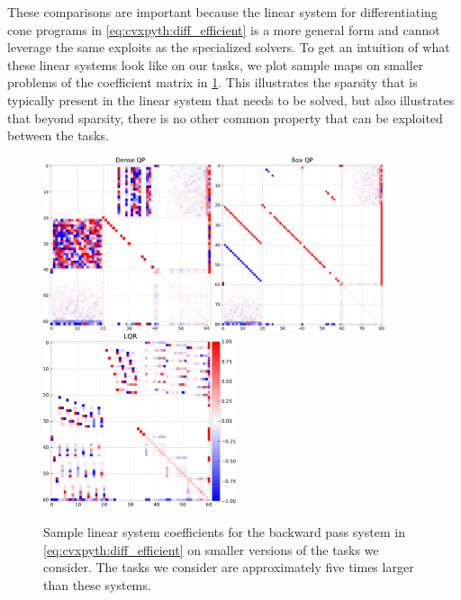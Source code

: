 These comparisons are important because the linear system for
differentiating cone programs in \cref{eq:cvxpyth:diff_efficient}
is a more general form and cannot leverage the same exploits
as the specialized solvers.
To get an intuition of what these linear systems look like on
our tasks, we plot sample maps on smaller problems of the
coefficient matrix in \cref{fig:cvxpyth:sample_maps}.
This illustrates the sparsity that is typically present in the
linear system that needs to be solved, but also illustrates
that beyond sparsity, there is no other common property that
can be exploited between the tasks.

\begin{figure}[!t]
  \centering
  \includegraphics[height=2.0in]{Ms_qpth_dense.pdf}
  \includegraphics[height=2.0in]{Ms_qpth_box.pdf}
  \includegraphics[height=2.0in]{Ms_MPC.pdf}
  \caption{Sample linear system coefficients for
    the backward pass system in \cref{eq:cvxpyth:diff_efficient}
    on smaller versions of the tasks we consider.
    The tasks we consider are approximately five
    times larger than these systems.
  }
  \label{fig:cvxpyth:sample_maps}
\end{figure}

